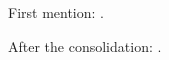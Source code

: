 \documentclass[letterpaper, 12pt]{article}
\begin{document}
\doublespacing
First mention: \citet{kamstra2003winter}.

After the consolidation: \citet{kamstra2003winter,kamstra2003winter,kamstra2015seasonal}.

\end{document}
